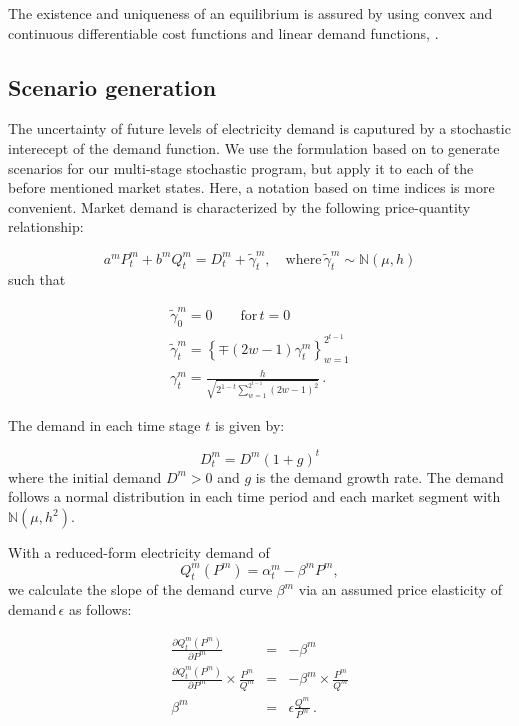 The existence and uniqueness of an equilibrium is assured by using convex and continuous differentiable cost functions and linear demand functions, \citep[see e.g.][]{Murphy1982}.


\subsection{Scenario generation}
\label{sec:scenario-generation}

The uncertainty of future levels of electricity demand is caputured by a stochastic interecept of the demand function. We use the formulation based on \cite{Genc2007} to generate scenarios for our multi-stage stochastic program, but apply it to each of the before mentioned market states. Here, a notation based on time indices is more convenient. Market demand is characterized by the following price-quantity relationship:

\begin{equation}
  \label{eq:marketdemandpq}
  a^mP^m_t+b^mQ^m_t=D^m_t+\tilde{\gamma}^m_t, \quad \mbox{where}\, \tilde{\gamma}^m_t\sim\mathbb{N}(\mu,h)
\end{equation}
such that

\begin{eqnarray*}
  \label{eq:3}
  \tilde{\gamma}^m_0=0\qquad\mbox{for}\, t=0\\
   \tilde{\gamma}^m_t=\left\{\mp(2w-1)\gamma^m_t\right\}_{w=1}^{2^{t-1}}\\
   \gamma^m_t=\frac{h}{\sqrt{2^{1-t}\sum_{w=1}^{2^{t-1}}(2w-1)^2}}\,.
\end{eqnarray*}

The demand in each time stage $t$ is given by:

\begin{equation}
  \label{eq:demandgrowth}
  D^m_t = D^m(1+g)^t
\end{equation}
where the initial demand $D^m>0$ and $g$ is the demand growth rate. The demand follows a normal distribution in each time period and each market segment with $\mathbb{N}(\mu, h^2)$.

With a reduced-form electricity demand of
\begin{equation*}
  \label{eq:5}
  Q^m_t(P^m) = \alpha^m_t-\beta^m P^m, 
\end{equation*}
we calculate the slope of the demand curve $\beta^m$  via an assumed price elasticity of demand\,$\epsilon$ as follows:

\begin{eqnarray}
  \frac{\partial Q^m_t(P^m)}{\partial P^m} &=& -\beta^m \nonumber\\
  \frac{\partial Q^m_t(P^m)}{\partial P^m}\times\frac{P^m}{Q^m} &=& -\beta^m\times\frac{P^m}{Q^m} \nonumber \\
\beta^m &=& \epsilon\frac{Q^m}{P^m}\label{eq:demandslope}\,.
\end{eqnarray}


